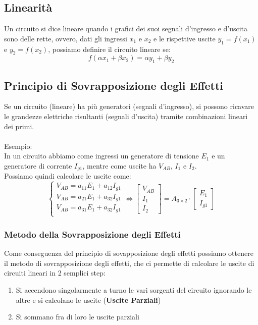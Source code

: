 \documentclass[../main.tex]{subfiles}
\begin{document}
	\subsection{Linearità}
	Un circuito si dice lineare quando i grafici dei suoi segnali d’ingresso e d’uscita sono delle rette, ovvero, dati gli ingressi $x_1$ e $x_2$ e le rispettive uscite $y_1 = f(x_1)$ e $y_2 = f(x_2)$, possiamo definire il circuito lineare se:
	\[f(\alpha x_1 + \beta x_2) = \alpha y_1 + \beta y_2\]
	\subsection{Principio di Sovrapposizione degli Effetti}
	Se un circuito (lineare) ha più generatori (segnali d’ingresso), si possono ricavare le grandezze elettriche risultanti (segnali
	d’uscita) tramite combinazioni lineari dei primi.\\\\
	Esempio:\\
	In un circuito abbiamo come ingressi un generatore di tensione $E_1$ e un generatore di corrente $I_{g1}$, mentre come uscite ha $V_{AB}$, $I_1$ e $I_2$.\\
	Possiamo quindi calcolare le uscite come:
	\[\begin{cases}
		V_{AB} = a_{11} E_1 + a_{12} I_{g1}\\
		V_{AB} = a_{21} E_1 + a_{32} I_{g1}\\
		V_{AB} = a_{31} E_1 + a_{32} I_{g1}\\
	\end{cases}
	\Leftrightarrow
	\begin{bmatrix}
		V_{AB}\\
		I_1\\
		I_2
	\end{bmatrix}
	=
	A_{3 \times 2} \cdot \begin{bmatrix}
		E_1\\
		I_{g1}
	\end{bmatrix}
	\]
	\subsubsection{Metodo della Sovrapposizione degli Effetti}
	Come conseguenza del principio di sovapposizione degli effetti possiamo ottenere il metodo di sovrapposizione degli effetti, che ci permette di calcolare le uscite di circuiti lineari in 2 semplici step:
	\begin{enumerate}
		\item Si accendono singolarmente a turno le vari sorgenti del circuito ignorando le altre e si calcolano le uscite (\textbf{Uscite Parziali})
		\item Si sommano fra di loro le uscite parziali
	\end{enumerate}
\end{document}

